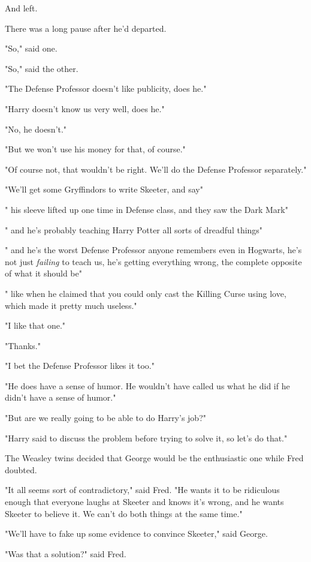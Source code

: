 And left.

There was a long pause after he'd departed.

"So," said one.

"So," said the other.

"The Defense Professor doesn't like publicity, does he."

"Harry doesn't know us very well, does he."

"No, he doesn't."

"But we won't use his money for that, of course."

"Of course not, that wouldn't be right. We'll do the Defense Professor
separately."

"We'll get some Gryffindors to write Skeeter, and say{\el}"

"{\el} his sleeve lifted up one time in Defense class, and they saw the Dark
Mark{\el}"

"{\el} and he's probably teaching Harry Potter all sorts of dreadful
things{\el}"

"{\el} and he's the worst Defense Professor anyone remembers even in
Hogwarts, he's not just \emph{failing} to teach us, he's getting everything
wrong, the complete opposite of what it should be{\el}"

"{\el} like when he claimed that you could only cast the Killing Curse using
love, which made it pretty much useless."

"I like that one."

"Thanks."

"I bet the Defense Professor likes it too."

"He does have a sense of humor. He wouldn't have called us what he did if he
didn't have a sense of humor."

"But are we really going to be able to do Harry's job?"

"Harry said to discuss the problem before trying to solve it, so let's do that."

The Weasley twins decided that George would be the enthusiastic one while Fred
doubted.

"It all seems sort of contradictory," said Fred. "He wants it to be ridiculous
enough that everyone laughs at Skeeter and knows it's wrong, and he wants
Skeeter to believe it. We can't do both things at the same time."

"We'll have to fake up some evidence to convince Skeeter," said George.

"Was that a solution?" said Fred.

